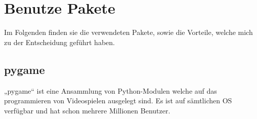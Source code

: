 \documentclass[a4paper, 10pt]{scrartcl}
\begin{document}
%

\section{Benutze Pakete}
Im Folgenden finden sie die verwendeten Pakete, sowie die Vorteile, welche mich zu der Entscheidung geführt haben.

\subsection{pygame}
„pygame“ ist eine Ansammlung von Python-Modulen welche auf das programmieren von Videospielen ausgelegt sind. Es ist auf sämtlichen OS verfügbar und hat schon mehrere Millionen Benutzer.
\end{document}
